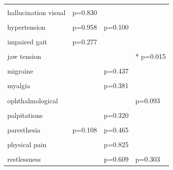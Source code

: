 \begin{table}[!h]
{\begin{tabular}[t]{llll}
\addlinespace
\cellcolor{gray!10}{feeling abnormal} & \cellcolor{gray!10}{p=0.580} & \cellcolor{gray!10}{} & \cellcolor{gray!10}{}\\
hallucination visual & p=0.830 &  & \\
\cellcolor{gray!10}{headache} & \cellcolor{gray!10}{p=0.521} & \cellcolor{gray!10}{* p=0.014} & \cellcolor{gray!10}{p=0.246}\\
hypertension & p=0.958 & p=0.100 & \\
\cellcolor{gray!10}{illusion} & \cellcolor{gray!10}{* p=0.049} & \cellcolor{gray!10}{p=0.339} & \cellcolor{gray!10}{}\\
\addlinespace
impaired gait & p=0.277 &  & \\
\cellcolor{gray!10}{irritability} & \cellcolor{gray!10}{} & \cellcolor{gray!10}{} & \cellcolor{gray!10}{p=0.278}\\
jaw tension &  &  & * p=0.015\\
\cellcolor{gray!10}{lack of appetite} & \cellcolor{gray!10}{p=0.769} & \cellcolor{gray!10}{} & \cellcolor{gray!10}{p=0.209}\\
migraine &  & p=0.437 & \\
\addlinespace
\cellcolor{gray!10}{muscle tension} & \cellcolor{gray!10}{} & \cellcolor{gray!10}{} & \cellcolor{gray!10}{p=0.229}\\
myalgia &  & p=0.381 & \\
\cellcolor{gray!10}{nausea} & \cellcolor{gray!10}{* p=0.015} & \cellcolor{gray!10}{* p=0.036} & \cellcolor{gray!10}{p=0.130}\\
ophthalmological &  &  & p=0.093\\
\cellcolor{gray!10}{pain} & \cellcolor{gray!10}{} & \cellcolor{gray!10}{} & \cellcolor{gray!10}{p=0.079}\\
\addlinespace
palpitations &  & p=0.320 & \\
\cellcolor{gray!10}{panic reaction} & \cellcolor{gray!10}{} & \cellcolor{gray!10}{p=0.611} & \cellcolor{gray!10}{}\\
paresthesia & p=0.108 & p=0.465 & \\
\cellcolor{gray!10}{perspiration} & \cellcolor{gray!10}{p=0.367} & \cellcolor{gray!10}{} & \cellcolor{gray!10}{* p=0.043}\\
physical pain &  & p=0.825 & \\
\addlinespace
\cellcolor{gray!10}{pseudohallucination} & \cellcolor{gray!10}{p=0.416} & \cellcolor{gray!10}{} & \cellcolor{gray!10}{}\\
restlessness &  & p=0.609 & p=0.303\\

\end{tabular}}
\end{table}
